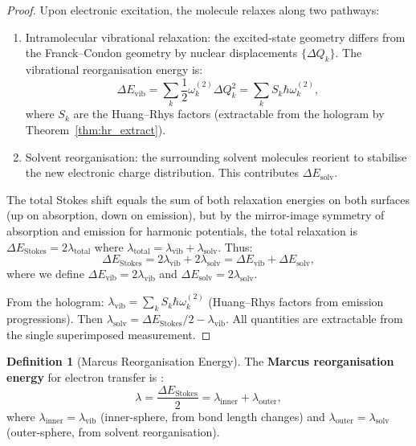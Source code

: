 \documentclass[11pt,twocolumn,a4paper]{article}
\theoremstyle{definition}
\newtheorem{definition}[theorem]{Definition}
\theoremstyle{remark}
\begin{document}
\begin{proof}
Upon electronic excitation, the molecule relaxes along two pathways:
\begin{enumerate}[label=(\roman*)]
  \item Intramolecular vibrational relaxation: the excited-state geometry differs from the Franck--Condon geometry by nuclear displacements $\{\Delta Q_k\}$. The vibrational reorganisation energy is:
  \begin{equation}
  \Delta E_{\mathrm{vib}} = \sum_k \frac{1}{2} \omega_k^{(2)} \Delta Q_k^2 = \sum_k S_k \hbar \omega_k^{(2)},
  \end{equation}
  where $S_k$ are the Huang--Rhys factors (extractable from the hologram by Theorem~\ref{thm:hr_extract}).
  \item Solvent reorganisation: the surrounding solvent molecules reorient to stabilise the new electronic charge distribution. This contributes $\Delta E_{\mathrm{solv}}$.
\end{enumerate}

The total Stokes shift equals the sum of both relaxation energies on both surfaces (up on absorption, down on emission), but by the mirror-image symmetry of absorption and emission for harmonic potentials, the total relaxation is $\Delta E_{\mathrm{Stokes}} = 2\lambda_{\mathrm{total}}$ where $\lambda_{\mathrm{total}} = \lambda_{\mathrm{vib}} + \lambda_{\mathrm{solv}}$. Thus:
\begin{equation}
\Delta E_{\mathrm{Stokes}} = 2\lambda_{\mathrm{vib}} + 2\lambda_{\mathrm{solv}} = \Delta E_{\mathrm{vib}} + \Delta E_{\mathrm{solv}},
\end{equation}
where we define $\Delta E_{\mathrm{vib}} = 2\lambda_{\mathrm{vib}}$ and $\Delta E_{\mathrm{solv}} = 2\lambda_{\mathrm{solv}}$.

From the hologram: $\lambda_{\mathrm{vib}} = \sum_k S_k \hbar\omega_k^{(2)}$ (Huang--Rhys factors from emission progressions). Then $\lambda_{\mathrm{solv}} = \Delta E_{\mathrm{Stokes}}/2 - \lambda_{\mathrm{vib}}$. All quantities are extractable from the single superimposed measurement.
\end{proof}

\begin{definition}[Marcus Reorganisation Energy]
\label{def:marcus}
The \textbf{Marcus reorganisation energy} for electron transfer is \citep{marcus1956}:
\begin{equation}
\lambda = \frac{\Delta E_{\mathrm{Stokes}}}{2} = \lambda_{\mathrm{inner}} + \lambda_{\mathrm{outer}},
\end{equation}
where $\lambda_{\mathrm{inner}} = \lambda_{\mathrm{vib}}$ (inner-sphere, from bond length changes) and $\lambda_{\mathrm{outer}} = \lambda_{\mathrm{solv}}$ (outer-sphere, from solvent reorganisation).
\end{definition}
\end{document}

